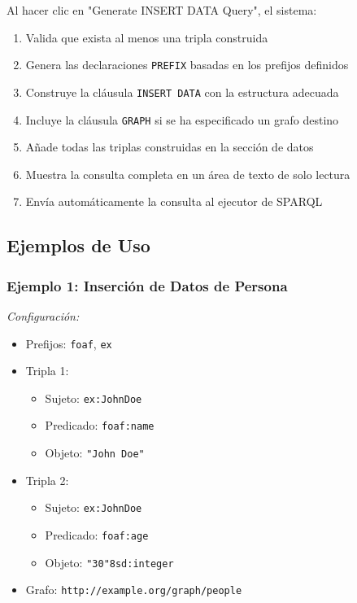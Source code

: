 \documentclass{article}
\begin{document}
Al hacer clic en "Generate INSERT DATA Query", el sistema:

\begin{enumerate}
    \item Valida que exista al menos una tripla construida
    \item Genera las declaraciones \texttt{PREFIX} basadas en los prefijos definidos
    \item Construye la cláusula \texttt{INSERT DATA} con la estructura adecuada
    \item Incluye la cláusula \texttt{GRAPH} si se ha especificado un grafo destino
    \item Añade todas las triplas construidas en la sección de datos
    \item Muestra la consulta completa en un área de texto de solo lectura
    \item Envía automáticamente la consulta al ejecutor de SPARQL
\end{enumerate}

\subsection{Ejemplos de Uso}
\label{subsec:triple-examples}

\subsubsection{Ejemplo 1: Inserción de Datos de Persona}
\label{subsubsec:example-person}

\textit{Configuración:}
\begin{itemize}
    \item Prefijos: \texttt{foaf}, \texttt{ex}
    \item Tripla 1:
    \begin{itemize}
        \item Sujeto: \texttt{ex:JohnDoe}
        \item Predicado: \texttt{foaf:name}
        \item Objeto: \texttt{"John Doe"}
    \end{itemize}
    \item Tripla 2:
    \begin{itemize}
        \item Sujeto: \texttt{ex:JohnDoe}
        \item Predicado: \texttt{foaf:age}
        \item Objeto: \texttt{"30"^^xsd:integer}
    \end{itemize}
    \item Grafo: \texttt{http://example.org/graph/people}
\end{itemize}
\end{document}
